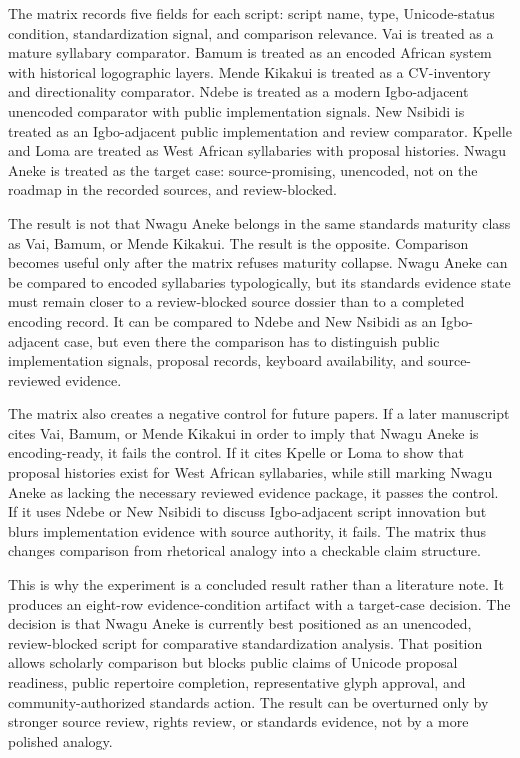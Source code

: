 \documentclass[sigconf,nonacm]{acmart}
\begin{document}
The matrix records five fields for each script: script name, type,
Unicode-status condition, standardization signal, and comparison relevance. Vai
is treated as a mature syllabary comparator. Bamum is treated as an encoded
African system with historical logographic layers. Mende Kikakui is treated as
a CV-inventory and directionality comparator. Ndebe is treated as a modern
Igbo-adjacent unencoded comparator with public implementation signals. New
Nsibidi is treated as an Igbo-adjacent public implementation and review
comparator. Kpelle and Loma are treated as West African syllabaries with
proposal histories. Nwagu Aneke is treated as the target case: source-promising,
unencoded, not on the roadmap in the recorded sources, and review-blocked.

The result is not that Nwagu Aneke belongs in the same standards maturity class
as Vai, Bamum, or Mende Kikakui. The result is the opposite. Comparison becomes
useful only after the matrix refuses maturity collapse. Nwagu Aneke can be
compared to encoded syllabaries typologically, but its standards evidence state
must remain closer to a review-blocked source dossier than to a completed
encoding record. It can be compared to Ndebe and New Nsibidi as an Igbo-adjacent
case, but even there the comparison has to distinguish public implementation
signals, proposal records, keyboard availability, and source-reviewed evidence.

The matrix also creates a negative control for future papers. If a later
manuscript cites Vai, Bamum, or Mende Kikakui in order to imply that Nwagu
Aneke is encoding-ready, it fails the control. If it cites Kpelle or Loma to
show that proposal histories exist for West African syllabaries, while still
marking Nwagu Aneke as lacking the necessary reviewed evidence package, it
passes the control. If it uses Ndebe or New Nsibidi to discuss Igbo-adjacent
script innovation but blurs implementation evidence with source authority, it
fails. The matrix thus changes comparison from rhetorical analogy into a
checkable claim structure.

This is why the experiment is a concluded result rather than a literature note.
It produces an eight-row evidence-condition artifact with a target-case
decision. The decision is that Nwagu Aneke is currently best positioned as an
unencoded, review-blocked script for comparative standardization analysis. That
position allows scholarly comparison but blocks public claims of Unicode
proposal readiness, public repertoire completion, representative glyph
approval, and community-authorized standards action. The result can be
overturned only by stronger source review, rights review, or standards evidence,
not by a more polished analogy.
\end{document}
